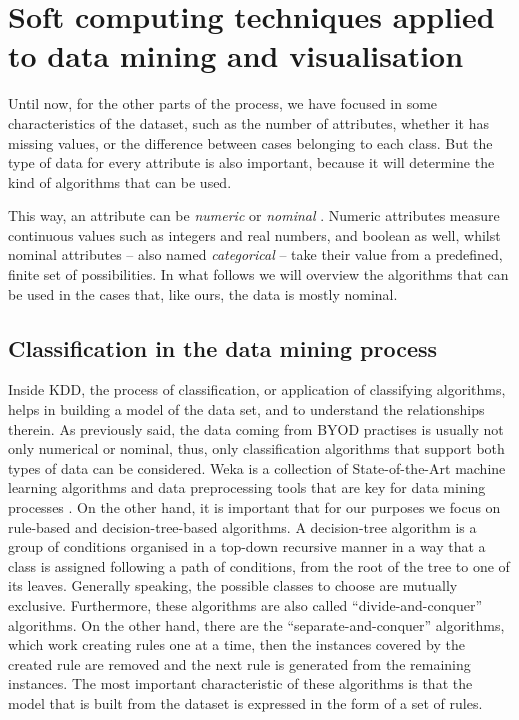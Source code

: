 \section{Soft computing techniques applied to data mining and visualisation}

Until now, for the other parts of the process, we have focused in some characteristics of the dataset, such as the number of attributes, whether it has missing values, or the difference between cases belonging to each class. But the type of data for every attribute is also important, because it will determine the kind of algorithms that can be used.

This way, an attribute can be \textit{numeric} or \textit{nominal} \cite{witten2016data}. Numeric attributes measure continuous values such as integers and real numbers, and boolean as well, whilst nominal attributes -- also named \textit{categorical} -- take their value from a predefined, finite set of possibilities. In what follows we will overview the algorithms that can be used in the cases that, like ours, the data is mostly nominal.

\subsection{Classification in the data mining process}

Inside KDD, the process of classification, or application of classifying algorithms, helps in building a model of the data set, and to understand the relationships therein. As previously said, the data coming from BYOD practises is usually not only numerical or nominal, thus, only classification algorithms that support both types of data can be considered. Weka \cite{weka:site} is a collection of State-of-the-Art machine learning algorithms and data preprocessing tools that are key for data mining processes \cite{witten2016data}. On the other hand, it is important that for our purposes we focus on rule-based and decision-tree-based algorithms. A decision-tree algorithm is a group of conditions organised in a top-down recursive manner in a way that a class is assigned following a path of conditions, from the root of the tree to one of its leaves. Generally speaking, the possible classes to choose are mutually exclusive. Furthermore, these algorithms are also called ``divide-and-conquer'' algorithms. On the other hand, there are the ``separate-and-conquer'' algorithms, which work creating rules one at a time, then the instances covered by the created rule are removed and the next rule is generated from the remaining instances. The most important characteristic of these algorithms is that the model that is built from the dataset is expressed in the form of a set of rules.

